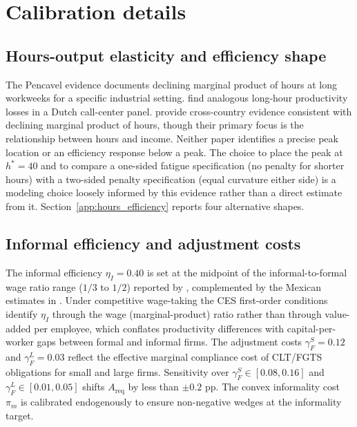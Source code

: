 \documentclass[12pt,a4paper]{article}
\begin{document}
\clearpage
\section{Calibration details}\label{app:calibration_details}

\subsection{Hours-output elasticity and efficiency shape}

The Pencavel evidence documents declining marginal product of hours at long workweeks for a specific industrial setting. \citet{CollewetSauermann2017} find analogous long-hour productivity losses in a Dutch call-center panel. \citet{BickFuchsSchundelnLagakos2018} provide cross-country evidence consistent with declining marginal product of hours, though their primary focus is the relationship between hours and income. Neither paper identifies a precise peak location or an efficiency response below a peak. The choice to place the peak at $h^*=40$ and to compare a one-sided fatigue specification (no penalty for shorter hours) with a two-sided penalty specification (equal curvature either side) is a modeling choice loosely informed by this evidence rather than a direct estimate from it. Section~\ref{app:hours_efficiency} reports four alternative shapes.

\subsection{Informal efficiency and adjustment costs}

The informal efficiency $\eta_I=0.40$ is set at the midpoint of the informal-to-formal wage ratio range ($1/3$ to $1/2$) reported by \citet{LaPortaShleifer2014}, complemented by the Mexican estimates in \citet{BussoFazioLevy2012}. Under competitive wage-taking the CES first-order conditions identify $\eta_I$ through the wage (marginal-product) ratio rather than through value-added per employee, which conflates productivity differences with capital-per-worker gaps between formal and informal firms. The adjustment costs $\gamma_F^S=0.12$ and $\gamma_F^L=0.03$ reflect the effective marginal compliance cost of CLT/FGTS obligations for small and large firms. Sensitivity over $\gamma_F^S\in[0.08,0.16]$ and $\gamma_F^L\in[0.01,0.05]$ shifts $A_{\text{req}}$ by less than $\pm 0.2$ pp. The convex informality cost $\pi_m$ is calibrated endogenously to ensure non-negative wedges at the informality target.
\end{document}

